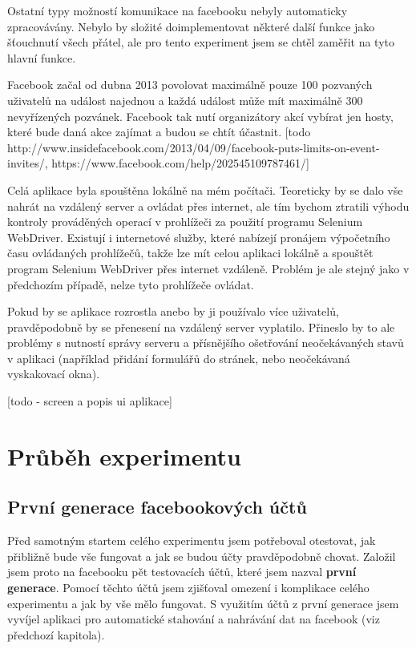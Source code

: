 \documentclass[thesis=M,czech]{FITthesis}[2013/05/10]
\begin{document}
Ostatní typy možností komunikace na facebooku nebyly automaticky zpracovávány. Nebylo by složité doimplementovat některé další funkce jako šťouchnutí všech přátel, ale pro tento experiment jsem se chtěl zaměřit na tyto hlavní funkce. 

Facebook začal od dubna 2013 povolovat maximálně pouze 100 pozvaných uživatelů na událost najednou a každá událost může mít maximálně 300 nevyřízených pozvánek. Facebook tak nutí organizátory akcí vybírat jen hosty, které bude daná akce zajímat a budou se chtít účastnit.
[todo http://www.insidefacebook.com/2013/04/09/facebook-puts-limits-on-event-invites/, https://www.facebook.com/help/202545109787461/]

Celá aplikace byla spouštěna lokálně na mém počítači. Teoreticky by se dalo vše nahrát na vzdálený server a ovládat přes internet, ale tím bychom ztratili výhodu kontroly prováděných operací v prohlížeči za použití programu Selenium WebDriver. Existují i internetové služby, které nabízejí pronájem výpočetního času ovládaných prohlížečů, takže lze mít celou aplikaci lokálně a spouštět program Selenium WebDriver přes internet vzdáleně. Problém je ale stejný jako v předchozím případě, nelze tyto prohlížeče ovládat.

Pokud by se aplikace rozrostla anebo by ji používalo více uživatelů, pravděpodobně by se přenesení na vzdálený server vyplatilo. Přineslo by to ale problémy s nutností správy serveru a přísnějšího ošetřování neočekávaných stavů v aplikaci (například přidání formulářů do stránek, nebo neočekávaná vyskakovací okna).

[todo - screen a popis ui aplikace]



\chapter{Průběh experimentu}

\section{První generace facebookových účtů}

Před samotným startem celého experimentu jsem potřeboval otestovat, jak přibližně bude vše fungovat a jak se budou účty pravděpodobně chovat. Založil jsem proto na facebooku pět testovacích účtů, které jsem nazval \textbf{první generace}. Pomocí těchto účtů jsem zjišťoval omezení i komplikace celého experimentu a jak by vše mělo fungovat. S využitím účtů z první generace jsem vyvíjel aplikaci pro automatické stahování a nahrávání dat na facebook (viz předchozí kapitola).
\end{document}
